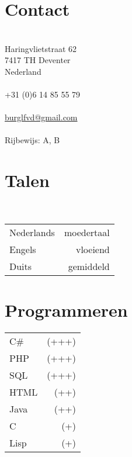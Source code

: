 \documentclass[]{friggeri-cv} %
\begin{document}


\begin{aside} %
   \section{Contact}\\
   Haringvlietstraat 62\\
   7417 TH Deventer\\
   Nederland\\
   ~\\
   +31 (0)6 14 85 55 79\\
   ~\\
   \href{mailto:burglfvd@gmail.com}{burglfvd@gmail.com}\\
   ~\\
   Rijbewijs: A, B\\

   \section{Talen}\\
   \begin{tabular}{l@{\quad} r}
      Nederlands & moedertaal\\
      Engels & vloeiend\\
      Duits & gemiddeld\\
   \end{tabular}

   \section{Programmeren}
   \begin{tabular}{l@{\quad} r}
      C\#  & (+++)\\
      PHP & (+++)\\
      SQL & (+++)\\
      HTML & (++)\\
      Java  & (++)\\
      C & (+)\\
      Lisp & (+)\\
   \end{tabular}

\end{aside}
\end{document}
